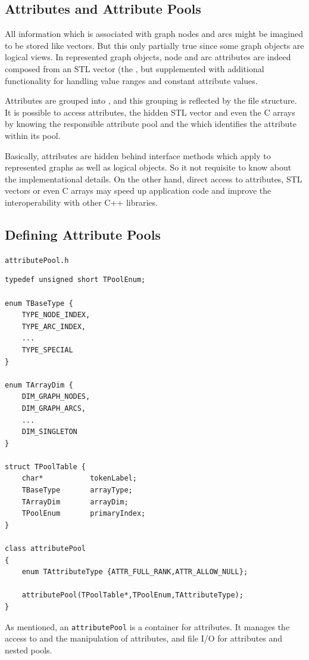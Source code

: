 \documentclass[a4paper,11pt,twoside]{book}
\begin{document}
\begin{multicols}{2}
\cleardoublepage
{}
\chapter{Attributes and Attribute Pools}
\thispagestyle{fancy}
\label{clb_attributes}
All information which is associated with graph nodes and arcs might be imagined
to be stored like vectors. But this only partially true since some graph objects
are logical views. In represented graph objects, node and arc attributes
are indeed composed from an STL vector (the ,
but supplemented with additional functionality for handling value ranges and
constant attribute values.

Attributes are grouped into , and this grouping is reflected by the file
structure. It is possible to access attributes, the hidden STL vector and even
the C arrays by knowing the responsible attribute pool and the  which
identifies the attribute within its pool.

Basically, attributes are hidden behind interface methods which apply to
represented graphs as well as logical objects. So it not requisite to know about
the implementational details. On the other hand, direct access to attributes,
STL vectors or even C arrays may speed up application code and improve the
interoperability with other C++ libraries.


\section{Defining Attribute Pools}
\myinclude\verb/attributePool.h/
\begin{mymethods}
\begin{verbatim}
typedef unsigned short TPoolEnum;

enum TBaseType {
    TYPE_NODE_INDEX,
    TYPE_ARC_INDEX,
    ...
    TYPE_SPECIAL
}

enum TArrayDim {
    DIM_GRAPH_NODES,
    DIM_GRAPH_ARCS,
    ...
    DIM_SINGLETON
}

struct TPoolTable {
    char*           tokenLabel;
    TBaseType       arrayType;
    TArrayDim       arrayDim;
    TPoolEnum       primaryIndex;
}

class attributePool
{
    enum TAttributeType {ATTR_FULL_RANK,ATTR_ALLOW_NULL};

    attributePool(TPoolTable*,TPoolEnum,TAttributeType);
}
\end{verbatim}
\end{mymethods}
As mentioned, an \verb/attributePool/ is a container for attributes. It manages
the access to and the manipulation of attributes, and file I/O for attributes and
nested pools.


\end{multicols}
\end{document}

